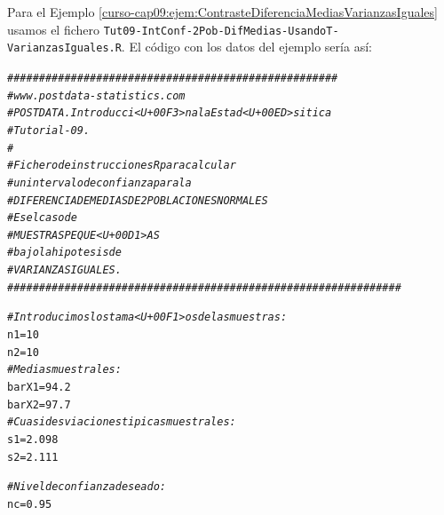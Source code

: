 \documentclass[10pt,a4paper]{article}\usepackage[]{graphicx}\usepackage[]{color}
\makeatletter
\newcommand{\hlnum}[1]{\textcolor[rgb]{0.686,0.059,0.569}{#1}}%
\newcommand{\hlcom}[1]{\textcolor[rgb]{0.678,0.584,0.686}{\textit{#1}}}%
\newcommand{\hlstd}[1]{\textcolor[rgb]{0.345,0.345,0.345}{#1}}%
\newcommand{\hlkwb}[1]{\textcolor[rgb]{0.69,0.353,0.396}{#1}}%
\newenvironment{kframe}{%
 \def\at@end@of@kframe{}%
 \ifinner\ifhmode%
  \def\at@end@of@kframe{\end{minipage}}%
  \begin{minipage}{\columnwidth}%
 \fi\fi%
 \def\FrameCommand##1{\hskip\@totalleftmargin \hskip-\fboxsep
 \colorbox{shadecolor}{##1}\hskip-\fboxsep
     \hskip-\linewidth \hskip-\@totalleftmargin \hskip\columnwidth}%
 \MakeFramed {\advance\hsize-\width
   \@totalleftmargin\z@ \linewidth\hsize
   \@setminipage}}%
 {\par\unskip\endMakeFramed%
 \at@end@of@kframe}
\newenvironment{knitrout}{}{} %
\makeatother
\begin{document}
Para el Ejemplo \ref{curso-cap09:ejem:ContrasteDiferenciaMediasVarianzasIguales} usamos el fichero {\tt Tut09-IntConf-2Pob-DifMedias-UsandoT-VarianzasIguales.R}. El código con los datos del ejemplo sería así:

\begin{knitrout}
\color{fgcolor}\begin{kframe}
\begin{alltt}
\hlcom{####################################################}
\hlcom{# www.postdata-statistics.com}
\hlcom{# POSTDATA. Introducci<U+00F3>n a la Estad<U+00ED>sitica}
\hlcom{# Tutorial-09.}
\hlcom{#}
\hlcom{# Fichero de instrucciones R para calcular}
\hlcom{# un intervalo de confianza para la}
\hlcom{# DIFERENCIA DE MEDIAS DE 2 POBLACIONES NORMALES}
\hlcom{# Es el caso de}
\hlcom{# MUESTRAS PEQUE<U+00D1>AS}
\hlcom{# bajo la hipotesis de}
\hlcom{# VARIANZAS IGUALES.}
\hlcom{##############################################################}

\hlcom{# Introducimos los tama<U+00F1>os de las muestras:}
\hlstd{n1} \hlkwb{=} \hlnum{10}
\hlstd{n2} \hlkwb{=} \hlnum{10}
\hlcom{# Medias muestrales:}
\hlstd{barX1} \hlkwb{=} \hlnum{94.2}
\hlstd{barX2} \hlkwb{=} \hlnum{97.7}
\hlcom{# Cuasidesviaciones tipicas muestrales:}
\hlstd{s1} \hlkwb{=} \hlnum{2.098}
\hlstd{s2} \hlkwb{=} \hlnum{2.111}

\hlcom{# Nivel de confianza deseado:}
\hlstd{nc} \hlkwb{=} \hlnum{0.95}


\end{alltt}
\end{kframe}
\end{knitrout}
\end{document}
